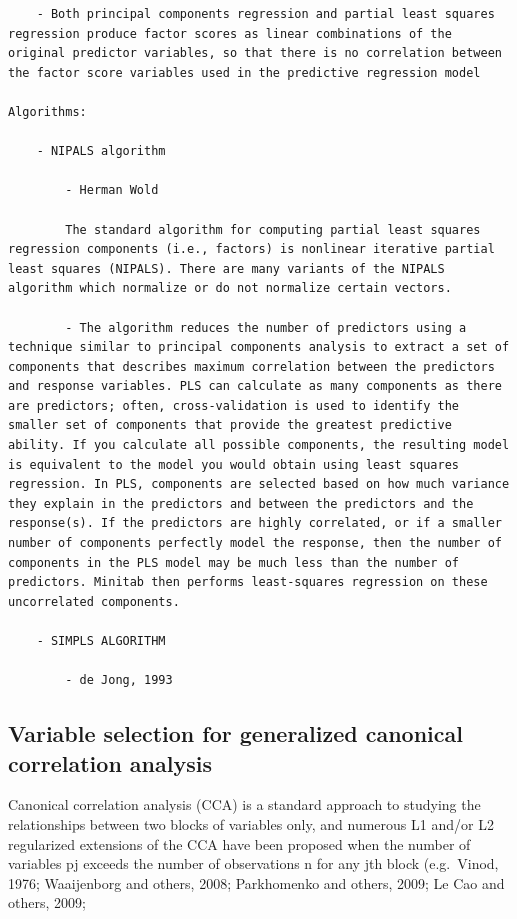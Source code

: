 \documentclass[
]{book}
\begin{document}
\begin{verbatim}
    - Both principal components regression and partial least squares regression produce factor scores as linear combinations of the original predictor variables, so that there is no correlation between the factor score variables used in the predictive regression model

Algorithms:

    - NIPALS algorithm

        - Herman Wold

        The standard algorithm for computing partial least squares regression components (i.e., factors) is nonlinear iterative partial least squares (NIPALS). There are many variants of the NIPALS algorithm which normalize or do not normalize certain vectors.

        - The algorithm reduces the number of predictors using a technique similar to principal components analysis to extract a set of components that describes maximum correlation between the predictors and response variables. PLS can calculate as many components as there are predictors; often, cross-validation is used to identify the smaller set of components that provide the greatest predictive ability. If you calculate all possible components, the resulting model is equivalent to the model you would obtain using least squares regression. In PLS, components are selected based on how much variance they explain in the predictors and between the predictors and the response(s). If the predictors are highly correlated, or if a smaller number of components perfectly model the response, then the number of components in the PLS model may be much less than the number of predictors. Minitab then performs least-squares regression on these uncorrelated components.

    - SIMPLS ALGORITHM

        - de Jong, 1993
\end{verbatim}

\hypertarget{variable-selection-for-generalized-canonical-correlation-analysis}{%
\subsection{Variable selection for generalized canonical correlation analysis}\label{variable-selection-for-generalized-canonical-correlation-analysis}}

Canonical correlation analysis (CCA) is a standard approach to studying the relationships between two blocks of variables only, and numerous L1 and/or L2 regularized extensions of the CCA have been proposed when the number of variables pj exceeds the number of observations n for any jth block (e.g.~Vinod, 1976; Waaijenborg and others, 2008; Parkhomenko and others, 2009; Le Cao and others, 2009;
\end{document}
